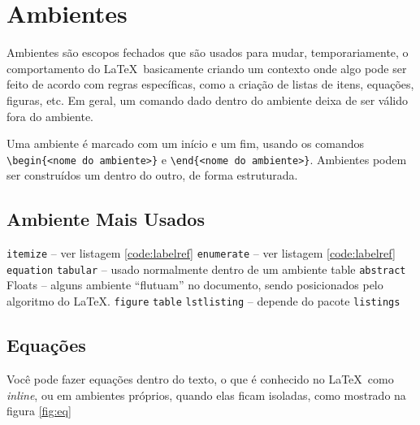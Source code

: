 \section{Ambientes}

   Ambientes são escopos fechados que são usados para mudar, temporariamente, o comportamento do \LaTeX\, basicamente criando um  contexto onde algo pode ser feito de acordo com
   regras específicas, como a criação de listas de itens,
   equações, figuras, etc.  Em geral, um comando dado dentro do ambiente deixa de ser válido fora do ambiente.
   
   
   Uma ambiente é marcado com um início e um fim, usando os
   comandos \lstinline|\begin{<nome do ambiente>}| e 
   \lstinline|\end{<nome do ambiente>}|. Ambientes podem
   ser construídos um dentro do outro, de forma estruturada.


\subsection{Ambiente Mais Usados}
\begin{outline}
    \1 \lstinline|itemize| -- ver listagem \ref{code:labelref}
    \1 \lstinline|enumerate| -- ver listagem \ref{code:labelref}
    \1 \lstinline|equation|
    \1 \lstinline|tabular|  -- usado normalmente dentro de um ambiente table
    \1 \lstinline|abstract|
    \1 Floats -- alguns ambiente ``flutuam'' no documento,
    sendo posicionados pelo algoritmo do \LaTeX.
    \2 \lstinline|figure|
    \2 \lstinline|table|
    \2 \lstinline|lstlisting| -- depende do pacote \lstinline|listings|
\end{outline}

\subsection{Equações}

Você pode fazer equações dentro do texto, o que é conhecido no \LaTeX\ como \textit{inline}, ou em ambientes próprios, quando elas ficam isoladas, como mostrado na figura \ref{fig:eq}

